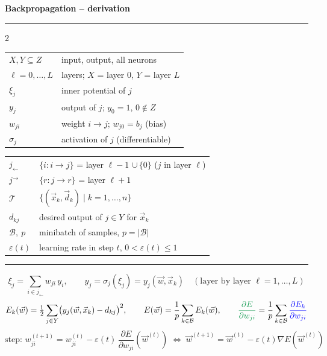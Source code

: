 \documentclass[10pt]{article}
\newcommand{\pd}[2]{\frac{\partial #1}{\partial #2}}
\newcommand{\into}{_{\leftarrow}}
\newcommand{\out}{^{\rightarrow}}
\newcommand{\hsec}[1]{\par\vspace{4pt}{\large\bfseries #1}\par\vspace{1pt}\hrule\vspace{3pt}}
\begin{document}
\begin{center}
  {\LARGE\bfseries Backpropagation -- derivation}
\end{center}

\hsec{1\quad Notation}
\begin{multicols}{2}
\begin{tabular}{@{}ll@{}}
$X,Y\subseteq Z$ & input, output, all neurons \\
$\ell=0,\dots,L$ & layers;\; $X$ = layer $0$,\; $Y$ = layer $L$ \\
$\xi_j$ & inner potential of $j$ \\
$y_j$ & output of $j$;\; $y_0=1$,\; $0\notin Z$ \\
$w_{ji}$ & weight $i\to j$;\; $w_{j0}=b_j$ (bias) \\
$\sigma_j$ & activation of $j$ (differentiable)
\end{tabular}

\begin{tabular}{@{}ll@{}}
$j\into$ & $\{i : i\to j\}$ = layer $\ell-1$ $\cup\,\{0\}$ ($j$ in layer $\ell$) \\
$j\out$ & $\{r : j\to r\}$ = layer $\ell+1$ \\
$\mathcal T$ & $\{(\vec x_k,\vec d_k)\mid k=1,\dots,n\}$ \\
$d_{kj}$ & desired output of $j\in Y$ for $\vec x_k$ \\
$\mathcal B,\ p$ & minibatch of samples,\; $p=|\mathcal B|$ \\
$\varepsilon(t)$ & learning rate in step $t$,\; $0<\varepsilon(t)\le 1$
\end{tabular}
\end{multicols}

\hsec{2\quad Forward pass, error, update}
\[
\xi_j=\sum_{i\in j\into} w_{ji}\,y_i,\qquad
y_j=\sigma_j(\xi_j)=y_j(\vec w,\vec x_k)\quad(\text{layer by layer } \ell=1,\dots,L)
\]
\[
E_k(\vec w)=\tfrac12\sum_{j\in Y}\bigl(y_j(\vec w,\vec x_k)-d_{kj}\bigr)^2,\qquad
E(\vec w)=\frac1p\sum_{k\in\mathcal B} E_k(\vec w),\qquad
\textcolor{ForestGreen}{\pd{E}{w_{ji}}}=\frac1p\sum_{k\in\mathcal B}\textcolor{blue}{\pd{E_k}{w_{ji}}}
\]
\[
\text{step: } w_{ji}^{(t+1)}=w_{ji}^{(t)}-\varepsilon(t)\,\pd{E}{w_{ji}}(\vec w^{(t)})
\;\Leftrightarrow\;\vec w^{(t+1)}=\vec w^{(t)}-\varepsilon(t)\nabla E(\vec w^{(t)})
\]
\end{document}
